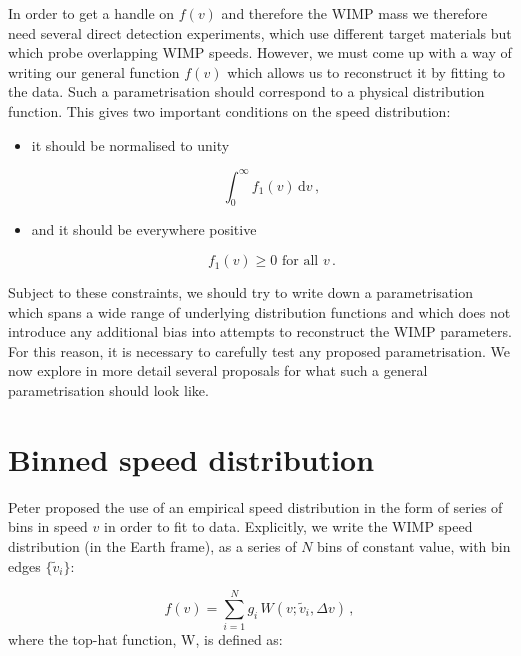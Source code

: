 In order to get a handle on $f(v)$ and therefore the WIMP mass we therefore need several direct detection experiments, which use different target materials but which probe overlapping WIMP speeds. However, we must come up with a way of writing our general function $f(v)$ which allows us to reconstruct it by fitting to the data. Such a parametrisation should correspond to a physical distribution function. This gives two important conditions on the speed distribution:

\begin{itemize}

\item it should be normalised to unity

\begin{equation}
\int_0^\infty f_1(v) \, \textrm{d}v\,,
\end{equation}

\item and it should be everywhere positive

\begin{equation}
f_1(v) \geq 0 \textrm{ for all  } v\,.
\end{equation}
\end{itemize}
Subject to these constraints, we should try to write down a parametrisation which spans a wide range of underlying distribution functions and which does not introduce any additional bias into attempts to reconstruct the WIMP parameters. For this reason, it is necessary to carefully test any proposed parametrisation. We now explore in more detail several proposals for what such a general parametrisation should look like.


\section{Binned speed distribution}
\label{sec:Speed:binned}
Peter proposed the use of an empirical speed distribution in the form of series of bins in speed $v$ in order to fit to data. Explicitly, we write the WIMP speed distribution (in the Earth frame), as a series of \(N\) bins of constant value, with bin edges \(\{ \tilde{v}_i\}\): 

\begin{equation}
\label{eq:Speed:binned}
f(v) = \sum_{i = 1}^N g_i \, W(v;\tilde{v}_i,\Delta v) \,,
\end{equation}
where the top-hat function, W, is defined as:

